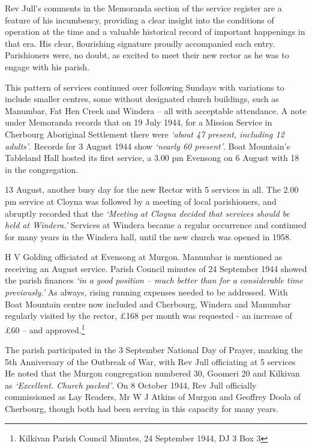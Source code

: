 Rev Jull's comments in the Memoranda section of the service register are a feature of his incumbency, providing a clear insight into the conditions of operation at the time and a valuable historical record of important happenings in that era. His clear, flourishing signature proudly accompanied each entry. Parishioners were, no doubt, as excited to meet their new rector as he was to engage with his parish.



This pattern of services continued over following Sundays with variations to include smaller centres, some without designated church buildings, such as Manumbar, Fat Hen Creek and Windera -- all with acceptable attendance. A note under Memoranda records that on 19 July 1944, for a Mission Service in Cherbourg Aboriginal Settlement there were \emph{`about 47 present, including 12 adults'}. Records for 3 August 1944 show \emph{`nearly 60 present'}. Boat Mountain's Tableland Hall hosted its first service, a 3.00 pm Evensong on 6 August with 18 in the congregation.



13 August, another busy day for the new Rector with 5 services in all. The 2.00 pm service at Cloyna was followed by a meeting of local parishioners, and abruptly recorded that the \emph{`Meeting at Cloyna decided that services should be held at Windera.'} Services at Windera became a regular occurrence and continued for many years in the Windera hall, until the new church was opened in 1958.



H V Golding officiated at Evensong at Murgon. Manumbar is mentioned as receiving an August service. Parish Council minutes of 24 September 1944 showed the parish finances \emph{`in a good position -- much better than for a considerable time previously.'} As always, rising running expenses needed to be addressed. With Boat Mountain centre now included and Cherbourg, Windera and Manumbar regularly visited by the rector, \pounds168 per month was requested - an increase of \pounds60 -- and approved.\footnote{Kilkivan Parish Council Minutes, 24 September 1944, DJ 3 Box 3}


The parish participated in the 3 September National Day of Prayer, marking the 5th Anniversary of the Outbreak of War, with Rev Jull officiating at 5 services He noted that the Murgon congregation numbered 30, Goomeri 20 and Kilkivan as \emph{`Excellent. Church packed'}. On 8 October 1944, Rev Jull officially commissioned as Lay Readers, Mr W J Atkins of Murgon and Geoffrey Doola of Cherbourg, though both had been serving in this capacity for many years.



